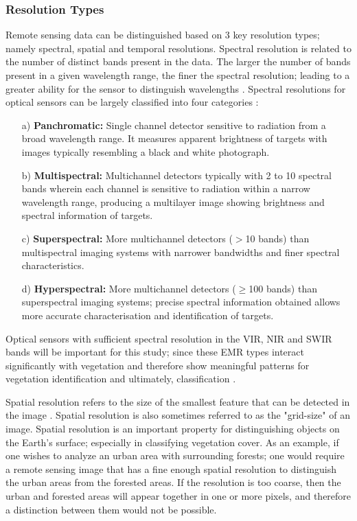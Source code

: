\subsubsection{Resolution Types}

\justify
Remote sensing data can be distinguished based on 3 key resolution types; namely spectral, spatial and temporal resolutions. Spectral resolution is related to the number of distinct bands present in the data. The larger the number of bands present in a given wavelength range, the finer the spectral resolution; leading to a greater ability for the sensor to distinguish wavelengths \citep{lwin2008}. Spectral resolutions for optical sensors can be largely classified into four categories :

\begin{itemize}
	\item [a) ] \textbf{Panchromatic:} Single channel detector sensitive to radiation from a broad wavelength range. It measures apparent brightness of targets with images typically resembling a black and white photograph.
	\item [b) ] \textbf{Multispectral:} Multichannel detectors typically with 2 to 10 spectral bands wherein each channel is sensitive to radiation within a narrow wavelength range, producing a multilayer image showing brightness and spectral information of targets.
	\item [c) ] \textbf{Superspectral:} More multichannel detectors ($>$10 bands) than multispectral imaging systems with narrower bandwidths and finer spectral characteristics.
	\item [d) ] \textbf{Hyperspectral:} More multichannel detectors ($\geq$100 bands) than superspectral imaging systems; precise spectral information obtained allows more accurate characterisation and identification of targets.
\end{itemize}

\justify
Optical sensors with sufficient spectral resolution in the VIR, NIR and SWIR bands will be important for this study; since these EMR types interact significantly with vegetation and therefore show meaningful patterns for vegetation identification and ultimately, classification \citep{lwin2008}.

\justify
Spatial resolution refers to the size of the smallest feature that can be detected in the image \citep{lwin2008}. Spatial resolution is also sometimes referred to as the "grid-size" of an image. Spatial resolution is an important property for distinguishing objects on the Earth's surface; especially in classifying vegetation cover. As an example, if one wishes to analyze an urban area with surrounding forests; one would require a remote sensing image that has a fine enough spatial resolution to distinguish the urban areas from the forested areas. If the resolution is too coarse, then the urban and forested areas will appear together in one or more pixels, and therefore a distinction between them would not be possible.

